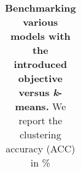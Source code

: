 \documentclass{bmvc2k}
\begin{document}
\begin{table}[h]
\begin{center}
\begin{tabular}{lcccc}
			\bottomrule
		\end{tabular}\label{tab:addlabel}\label{table:sota-comparison}
	\newline \newline \caption{\textbf{Benchmarking various models with the introduced objective versus \textit{k}-means.} We report the clustering accuracy (ACC) in \%}
\end{center}
\end{table}
	 \clearpage{}
\end{document}
